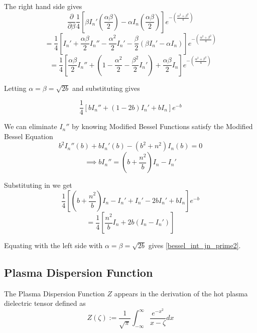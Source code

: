 The right hand side gives
\begin{equation*}
	\frac{\partial}{\partial \beta} \frac{1}{4} \left[ \beta I_n' \left( \frac{\alpha \beta}{2} \right) - \alpha I_n \left( \frac{\alpha \beta}{2} \right) \right] e^{-\left( \frac{ \alpha^2 + \beta^2 }{4} \right)}
\end{equation*}
\begin{equation*}
	= \frac{1}{4} \left[ I_n' + \frac{\alpha \beta}{2} I_n'' - \frac{\alpha^2}{2} I_n' - \frac{\beta}{2} \left( \beta I_n' - \alpha I_n \right) \right] e^{-\left( \frac{ \alpha^2 + \beta^2 }{4} \right)}
\end{equation*}
\begin{equation}
	= \frac{1}{4} \left[ \frac{\alpha \beta}{2} I_n'' + \left( 1 - \frac{\alpha^2}{2} - \frac{\beta^2}{2} I_n' \right) + \frac{\alpha \beta}{2} I_n \right] e^{-\left( \frac{ \alpha^2 + \beta^2 }{4} \right)}
\end{equation}

Letting $\alpha = \beta = \sqrt{2b}$ and substituting gives

\begin{equation}
	\frac{1}{4} \left[ b I_n'' + \left(1 - 2b \right) I_n' + b I_n \right] e^{-b}
\end{equation}

We can eliminate $I_n''$ by knowing Modified Bessel Functions satisfy the Modified Bessel Equation
\begin{equation}
	b^2 I_n'' \left( b \right) + b I_n' \left( b \right) - (b^2 + n^2) I_n \left( b \right) = 0
\end{equation}
\begin{equation}
	\implies bI_n'' = \left( b + \frac{n^2}{b} \right) I_n - I_n'
\end{equation}

Substituting in we get
\begin{equation*}
	\frac{1}{4} \left[ \left( b + \frac{n^2}{b} \right) I_n - I_n' + I_n' - 2b I_n' + b I_n \right] e^{-b}
\end{equation*}
\begin{equation}
	= \frac{1}{4} \left[ \frac{n^2}{b} I_n + 2b \left( I_n - I_n' \right) \right]
\end{equation}

Equating with the left side with $\alpha = \beta = \sqrt{2b}$ gives \eqref{bessel_int_jn_prime2}.

\subsection{Plasma Dispersion Function}
The Plasma Dispersion Function $Z$ appears in the derivation of the hot plasma dielectric tensor defined as
\begin{equation}\label{plasma_dispersion_function}
	Z(\zeta) := \frac{1}{\sqrt{\pi}} \int_{-\infty}^\infty \frac{e^{-x^2}}{x-\zeta} dx
\end{equation}

